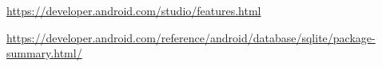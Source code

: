 \begin{thebibliography}{99999}
\singlespace\normalsize

 \url{https://developer.android.com/studio/features.html}


 \url{https://developer.android.com/reference/android/database/sqlite/package-summary.html/}


\end{thebibliography}